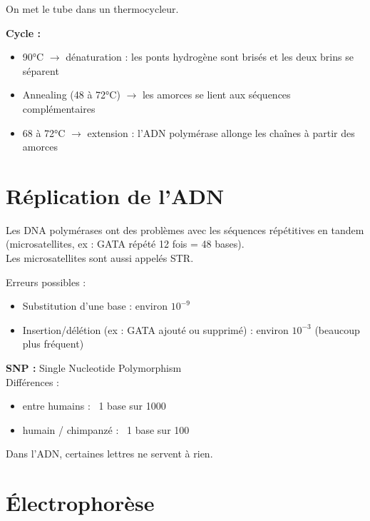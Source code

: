 \documentclass[11pt]{article}
\begin{document}
On met le tube dans un thermocycleur.

\vspace{0.3cm}

\textbf{Cycle :}
\begin{itemize}
    \item 90°C $\rightarrow$ dénaturation : les ponts hydrogène sont brisés et les deux brins se séparent
    \item Annealing (48 à 72°C) $\rightarrow$ les amorces se lient aux séquences complémentaires
    \item 68 à 72°C $\rightarrow$ extension : l'ADN polymérase allonge les chaînes à partir des amorces
\end{itemize}

\section*{Réplication de l'ADN}

Les DNA polymérases ont des problèmes avec les séquences répétitives en tandem (microsatellites, ex : GATA répété 12 fois = 48 bases).\\
Les microsatellites sont aussi appelés STR.

\vspace{0.3cm}

Erreurs possibles :
\begin{itemize}
    \item Substitution d'une base : environ $10^{-9}$
    \item Insertion/délétion (ex : GATA ajouté ou supprimé) : environ $10^{-3}$ (beaucoup plus fréquent)
\end{itemize}

\vspace{0.3cm}

\textbf{SNP :} Single Nucleotide Polymorphism\\
Différences :
\begin{itemize}
    \item entre humains : ~1 base sur 1000
    \item humain / chimpanzé : ~1 base sur 100
\end{itemize}

Dans l'ADN, certaines lettres ne servent à rien.

\section*{Électrophorèse}
\end{document}
